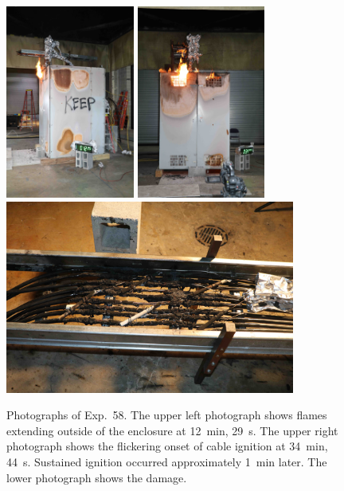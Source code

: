 \begin{figure}[p]
\centering
\includegraphics[height=2.50in,angle=-90]{../FIGURES/Test_58_12_min_29_s}  \hspace{0.1in}
\includegraphics[height=2.50in,angle=-90]{../FIGURES/Test_58_34_min_44_s} \\  \vspace{0.1in}
\includegraphics[height=2.50in]{../FIGURES/Test_58_scar}
\caption[Photographs of Exp.~58]{Photographs of Exp.~58. The upper left photograph shows flames extending outside of the enclosure at 12~min, 29~s. The upper right photograph shows the flickering onset of cable ignition at 34~min, 44~s. Sustained ignition occurred approximately 1~min later. The lower photograph shows the damage.}
\label{fig:Test_58_photos}
\end{figure}


